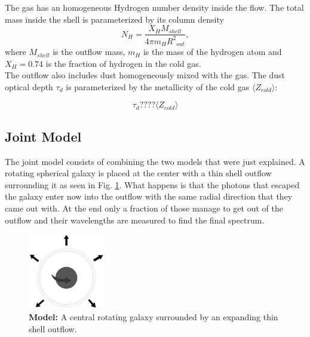 \documentclass{latex/emulateapj}
\begin{document}
The gas has an homogeneous Hydrogen number density inside the flow. The total mass inside the shell is parameterized by its column density\\

\begin{equation}
\label{eq:nh}
N_H = \frac{X_H M_{shell}}{4\pi m_H {R^2}_{out}},
\end{equation}
%
where $M_{shell}$ is the outflow mass, $m_H$ is the mass of the hydrogen atom and $X_H=0.74$ is the fraction of hydrogen in the cold gas.\\

The outflow also includes dust homogeneously mixed with the gas. The dust optical depth $\tau_d$ is parameterized by the metallicity of the cold gas $\langle Z_{cold} \rangle$: 

\begin{equation}
\label{eq:z}
\tau_{d} ???? \langle Z_{cold} \rangle
\end{equation}

\subsection{Joint Model}

The joint model consists of combining the two models that were just explained. A rotating spherical galaxy is placed at the center with a thin shell outflow surrounding it as seen in Fig. \ref{fig:model}. What happens is that the photons that escaped the galaxy enter now into the outflow with the same radial direction that they came out with. At the end only a fraction of those manage to get out of the outflow and their wavelengths are measured to find the final spectrum. \\

\begin{figure}[h!]
\begin{center}
  \includegraphics[width=0.3\textwidth]{./figures/model.png}
\end{center}
\caption{\textbf{Model:} A central rotating galaxy surrounded by an expanding thin shell outflow.
\label{fig:model}}
\end{figure}
\end{document}
